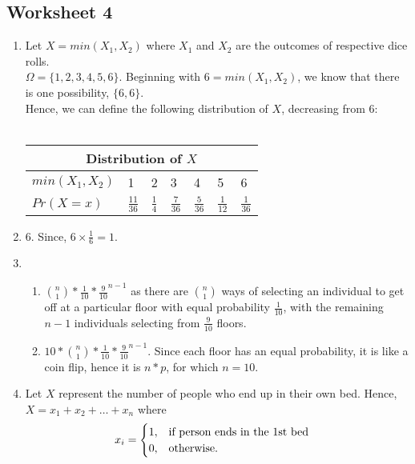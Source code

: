 \documentclass[12pt]{article}
\theoremstyle{plain}
\theoremstyle{definition}
\numberwithin{equation}{theorem}
\begin{document}
\subsection{Worksheet 4}
\begin{enumerate}
\item Let $X = min(X_{1},X_{2})$ where $X_{1}$ and $X_{2}$ are the outcomes of respective dice rolls.\\
$\Omega = \{1,2,3,4,5,6\}$. Beginning with $6 = min(X_{1},X_{2})$, we know that there is one possibility, $\{6,6\}$.\\
Hence, we can define the following distribution of $X$, decreasing from 6:\\
\\
\begin{tabular}{ |p{2.5cm}|p{2cm}|p{2cm}|p{2cm}|p{2cm}|p{2cm}|p{2cm}|  }
 \hline
 \multicolumn{7}{|c|}{Distribution of $X$} \\
 \hline
 $min(X_{1},X_{2})$&1&2&3&4&5&6 \\
 \hline
 $Pr(X =x)$&$\frac{11}{36}$&$\frac{1}{4}$&$\frac{7}{36}$&$\frac{5}{36}$&$\frac{1}{12}$& $\frac{1}{36}$ \\
 \hline
\end{tabular}
\item $6$. Since, $6 \times \frac{1}{6} = 1$. 
\addtocounter{enumi}{1}
\item
	\begin{enumerate}
	\item $\binom{n}{1}*\frac{1}{10}*\frac{9}{10}^{n-1}$ as there are $\binom{n}{1}$ ways of selecting an individual to get off at a particular floor with equal probability $\frac{1}{10}$, with the remaining $n-1$ individuals selecting from $\frac{9}{10}$ floors.
	\item $10*\binom{n}{1}*\frac{1}{10}*\frac{9}{10}^{n-1}$. Since each floor has an equal probability, it is like a coin flip, hence it is $n*p$, for which $n=10$.
	\end{enumerate}
\addtocounter{enumi}{1}
\item Let $X$ represent the number of people who end up in their own bed. Hence, \\
$X = x_{1}+x_{2}+\dots+x_{n}$ where
\begin{align}
x_{i} & = \begin{cases}
                1, & $if person ends in the 1st bed$\\
                 0, & $otherwise.$
                    \end{cases}
\end{align}

\end{enumerate}
\end{document}
